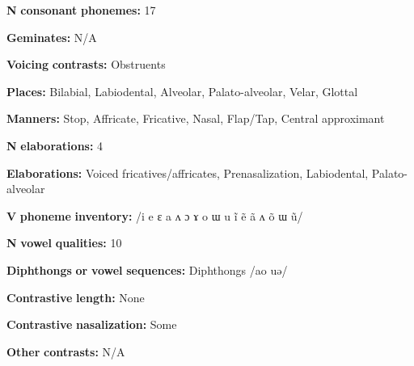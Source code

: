 \documentclass[output=paper]{langsci/langscibook}
\begin{document}
\begin{styleBody}
\textbf{N} \textbf{consonant} \textbf{phonemes:} 17
\end{styleBody}

\begin{styleBody}
\textbf{Geminates:} N/A
\end{styleBody}

\begin{styleBody}
\textbf{Voicing} \textbf{contrasts:} Obstruents
\end{styleBody}

\begin{styleBody}
\textbf{Places:} Bilabial, Labiodental, Alveolar, Palato-alveolar, Velar, Glottal
\end{styleBody}

\begin{styleBody}
\textbf{Manners:} Stop, Affricate, Fricative, Nasal, Flap/Tap, Central approximant
\end{styleBody}

\begin{styleBody}
\textbf{N} \textbf{elaborations:} 4
\end{styleBody}

\begin{styleBody}
\textbf{Elaborations:} Voiced fricatives/affricates, Prenasalization, Labiodental, Palato-alveolar
\end{styleBody}

\begin{styleBody}
\textbf{V} \textbf{phoneme} \textbf{inventory:} /i e ɛ a ʌ ɔ ɤ o ɯ u ĩ ẽ ã ʌ õ ɯ ũ/
\end{styleBody}

\begin{styleBody}
\textbf{N} \textbf{vowel} \textbf{qualities:} 10
\end{styleBody}

\begin{styleBody}
\textbf{Diphthongs} \textbf{or} \textbf{vowel} \textbf{sequences:} Diphthongs /ao uə/
\end{styleBody}

\begin{styleBody}
\textbf{Contrastive} \textbf{length:} None
\end{styleBody}

\begin{styleBody}
\textbf{Contrastive} \textbf{nasalization:} Some
\end{styleBody}

\begin{styleBody}
\textbf{Other} \textbf{contrasts:} N/A
\end{styleBody}
\end{document}
